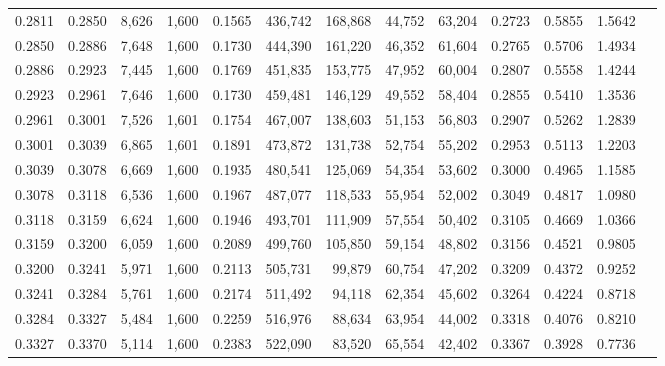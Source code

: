 \begin{tabular}{rrrrrrrrrrrrr}
0.2811 & 0.2850 &  8,626 & 1,600 &                                     0.1565 & 436,742 & 168,868 &  44,752 &  63,204 & 0.2723 & 0.5855 & 1.5642 \\
0.2850 & 0.2886 &  7,648 & 1,600 &                                     0.1730 & 444,390 & 161,220 &  46,352 &  61,604 & 0.2765 & 0.5706 & 1.4934 \\
0.2886 & 0.2923 &  7,445 & 1,600 &                                     0.1769 & 451,835 & 153,775 &  47,952 &  60,004 & 0.2807 & 0.5558 & 1.4244 \\
0.2923 & 0.2961 &  7,646 & 1,600 &                                     0.1730 & 459,481 & 146,129 &  49,552 &  58,404 & 0.2855 & 0.5410 & 1.3536 \\
0.2961 & 0.3001 &  7,526 & 1,601 &                                     0.1754 & 467,007 & 138,603 &  51,153 &  56,803 & 0.2907 & 0.5262 & 1.2839 \\
0.3001 & 0.3039 &  6,865 & 1,601 &                                     0.1891 & 473,872 & 131,738 &  52,754 &  55,202 & 0.2953 & 0.5113 & 1.2203 \\
0.3039 & 0.3078 &  6,669 & 1,600 &                                     0.1935 & 480,541 & 125,069 &  54,354 &  53,602 & 0.3000 & 0.4965 & 1.1585 \\
0.3078 & 0.3118 &  6,536 & 1,600 &                                     0.1967 & 487,077 & 118,533 &  55,954 &  52,002 & 0.3049 & 0.4817 & 1.0980 \\
0.3118 & 0.3159 &  6,624 & 1,600 &                                     0.1946 & 493,701 & 111,909 &  57,554 &  50,402 & 0.3105 & 0.4669 & 1.0366 \\
0.3159 & 0.3200 &  6,059 & 1,600 &                                     0.2089 & 499,760 & 105,850 &  59,154 &  48,802 & 0.3156 & 0.4521 & 0.9805 \\
0.3200 & 0.3241 &  5,971 & 1,600 &                                     0.2113 & 505,731 &  99,879 &  60,754 &  47,202 & 0.3209 & 0.4372 & 0.9252 \\
0.3241 & 0.3284 &  5,761 & 1,600 &                                     0.2174 & 511,492 &  94,118 &  62,354 &  45,602 & 0.3264 & 0.4224 & 0.8718 \\
0.3284 & 0.3327 &  5,484 & 1,600 &                                     0.2259 & 516,976 &  88,634 &  63,954 &  44,002 & 0.3318 & 0.4076 & 0.8210 \\
0.3327 & 0.3370 &  5,114 & 1,600 &                                     0.2383 & 522,090 &  83,520 &  65,554 &  42,402 & 0.3367 & 0.3928 & 0.7736 \\

\end{tabular}
